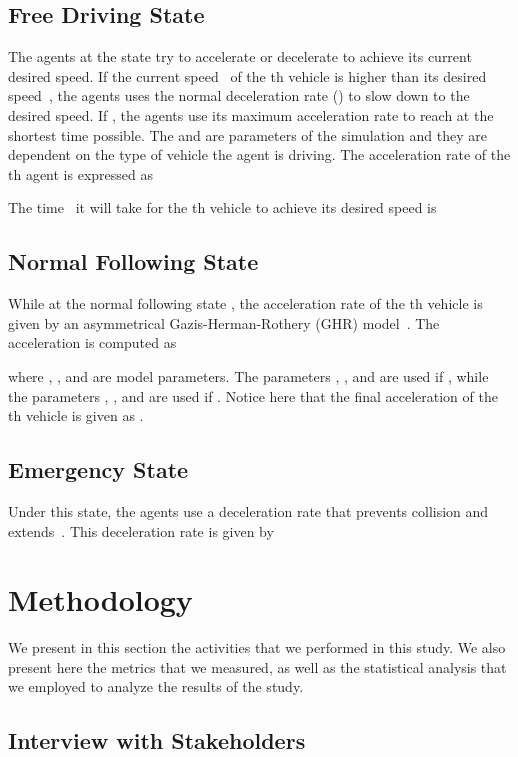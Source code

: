 \documentclass[preprint]{./acm_proc_article-sp}
\begin{document}
\subsection{ Free Driving State}

The agents at the  state try to accelerate or decelerate to achieve its current desired speed. If the current speed~ of the th vehicle is higher than its desired speed~, the agents uses the normal deceleration rate () to slow down to the desired speed. If  , the agents use its maximum acceleration rate  to reach  at the shortest time possible. The  and  are parameters of the simulation and they are dependent on the type of vehicle the agent is driving. The acceleration rate of the th agent is expressed as

The time~ it will take for the th vehicle to achieve its desired speed is

\subsection{ Normal Following State}

While at the normal following state , the acceleration rate of the th vehicle is given by an asymmetrical Gazis-Herman-Rothery (GHR) model~\citep{chandler58,gazis61,yang96}. The acceleration is computed as

where , , and  are model parameters. The parameters , , and  are used if , while the parameters , , and  are used if . Notice here that the final acceleration of the th vehicle is given as .

\subsection{ Emergency State}

Under this state, the agents use a deceleration rate that prevents collision and extends~. This deceleration rate is given by


\section{Methodology}\label{sec:method}

We present in this section the activities that we performed in this study. We also present here the metrics that we measured, as well as the statistical analysis that we employed to analyze the results of the study.

\pagebreak
\subsection{Interview with Stakeholders}
\end{document}
